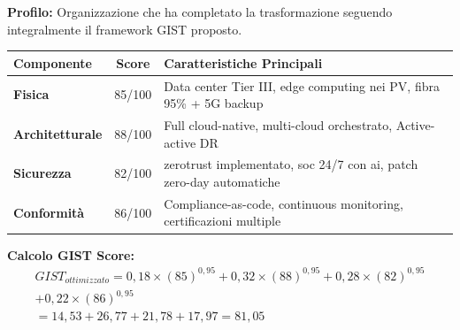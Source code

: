 \begin{tcolorbox}[
    colback=green!5!white,
    colframe=green!75!black,
    title={\textbf{Scenario 3:} GDO con Framework GIST Completo},
    fonttitle=\bfseries,
    boxrule=1.5pt,
    arc=2mm,
    breakable,
    width=\textwidth
]

\textbf{Profilo:} Organizzazione che ha completato la trasformazione seguendo integralmente il framework GIST proposto.

\begin{center}
\sffamily
\begin{tabularx}{\textwidth}{l c X}
\toprule
\textbf{Componente} & \textbf{Score} & \textbf{Caratteristiche Principali} \\
\midrule
\textbf{Fisica} & 85/100 & Data center Tier III, edge computing nei PV, fibra 95\% + 5G backup \\
\textbf{Architetturale} & 88/100 & Full cloud-native, multi-cloud orchestrato, Active-active DR \\
\textbf{Sicurezza} & 82/100 & \gls{zerotrust} implementato, \gls{soc} 24/7 con \gls{ai}, patch zero-day automatiche \\
\textbf{Conformità} & 86/100 & Compliance-as-code, continuous monitoring, certificazioni multiple \\
\bottomrule
\end{tabularx}
\end{center}

\textbf{Calcolo GIST Score:}
\begin{multline}
GIST_{ottimizzato} = 0,18 \times (85)^{0,95} + 0,32 \times (88)^{0,95} + 0,28 \times (82)^{0,95} \\ + 0,22 \times (86)^{0,95} \\
= 14,53 + 26,77 + 21,78 + 17,97 = \boxed{81,05}
\end{multline}

\end{tcolorbox}


